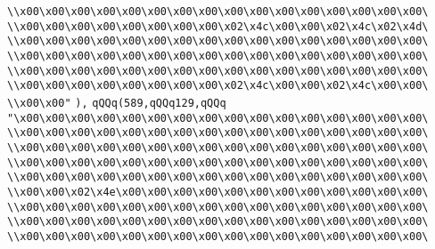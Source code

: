 \verb|\\x00\x00\x00\x00\x00\x00\x00\x00\x00\x00\x00\x00\x00\x00\x00\x00\|\newline
\verb|\\x00\x00\x00\x00\x00\x00\x00\x00\x02\x4c\x00\x00\x02\x4c\x02\x4d\|\newline
\verb|\\x00\x00\x00\x00\x00\x00\x00\x00\x00\x00\x00\x00\x00\x00\x00\x00\|\newline
\verb|\\x00\x00\x00\x00\x00\x00\x00\x00\x00\x00\x00\x00\x00\x00\x00\x00\|\newline
\verb|\\x00\x00\x00\x00\x00\x00\x00\x00\x00\x00\x00\x00\x00\x00\x00\x00\|\newline
\verb|\\x00\x00\x00\x00\x00\x00\x00\x00\x02\x4c\x00\x00\x02\x4c\x00\x00\|\newline
\verb|\\x00\x00"|\newline
\verb|),|\newline
\verb|qQQq(589,qQQq129,qQQq|\newline
\verb|"\x00\x00\x00\x00\x00\x00\x00\x00\x00\x00\x00\x00\x00\x00\x00\x00\|\newline
\verb|\\x00\x00\x00\x00\x00\x00\x00\x00\x00\x00\x00\x00\x00\x00\x00\x00\|\newline
\verb|\\x00\x00\x00\x00\x00\x00\x00\x00\x00\x00\x00\x00\x00\x00\x00\x00\|\newline
\verb|\\x00\x00\x00\x00\x00\x00\x00\x00\x00\x00\x00\x00\x00\x00\x00\x00\|\newline
\verb|\\x00\x00\x00\x00\x00\x00\x00\x00\x00\x00\x00\x00\x00\x00\x00\x00\|\newline
\verb|\\x00\x00\x02\x4e\x00\x00\x00\x00\x00\x00\x00\x00\x00\x00\x00\x00\|\newline
\verb|\\x00\x00\x00\x00\x00\x00\x00\x00\x00\x00\x00\x00\x00\x00\x00\x00\|\newline
\verb|\\x00\x00\x00\x00\x00\x00\x00\x00\x00\x00\x00\x00\x00\x00\x00\x00\|\newline
\verb|\\x00\x00\x00\x00\x00\x00\x00\x00\x00\x00\x00\x00\x00\x00\x00\x00\|\newline
